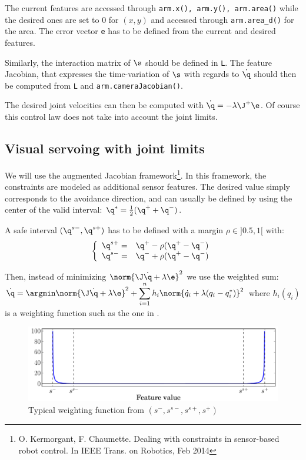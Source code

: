 \documentclass{ecnreport}
\begin{document}
The current features are accessed through \texttt{arm.x(), arm.y(), arm.area()} while the desired ones are set to 0 for $(x,y)$ and accessed through \texttt{arm.area\_d()} for the area. 
The error vector \texttt{e} has to be defined from the current and desired features.

Similarly, the interaction matrix of $\s$ should be defined in \texttt{L}. The feature Jacobian, that expresses the time-variation of $\s$ with regards to $\dot \q$ should then be computed
from \texttt{L} and \texttt{arm.cameraJacobian()}.

The desired joint velocities can then be computed with $\dot \q = -\lambda\J^+\e$. Of course this control law does not take into account the joint limits.

\subsection{Visual servoing with joint limits}

We will use the augmented Jacobian framework\footnote{O. Kermorgant, F. Chaumette. Dealing with constraints in sensor-based robot control. In IEEE Trans. on Robotics, Feb 2014}.
In this framework, the constraints are modeled as additional sensor features. The desired value simply corresponds to the avoidance direction, and can usually be defined by using the center of the valid interval: $\q^* = \frac{1}{2}(\q^+ + \q^-)$.

A safe interval $(\q^{s-}, \q^{s+})$ has to be defined with a margin $\rho\in]0.5,1[$ with:
\begin{equation*}
\left\{\begin{array}{ll}
	\q^{s+} = & \q^{+} - \rho(\q^+ - \q^-) \\
	\q^{s-} = & \q^{-} + \rho(\q^+ - \q^-)
\end{array}\right.
\end{equation*}

Then, instead of minimizing $\norm{\J\dot \q + \lambda\e}^2$ we use the weighted sum:\\ $\displaystyle \dot \q = \argmin \norm{\J\dot \q + \lambda\e}^2 + \sum_{i=1}^n h_i\norm{\dot q_i + \lambda(q_i - q_i^*)}^2$ where $h_i(q_i)$ is a weighting function such as the one in .
\begin{figure}\centering
	\includegraphics[width=.7\linewidth]{constraint_0inf}
	\caption{Typical weighting function from $(s^-, s^{s-}, s^{s+}, s^+)$}
	\label{weight}		
\end{figure}
\end{document}
